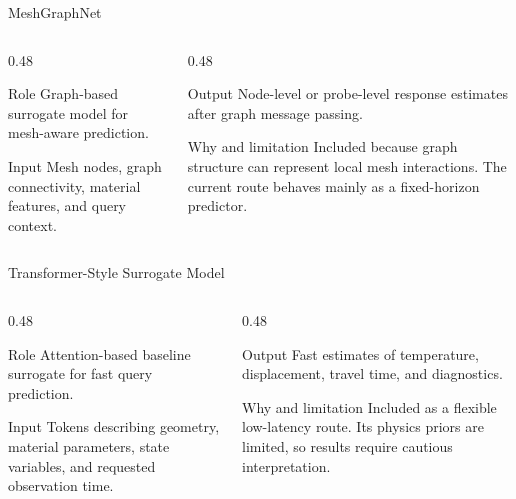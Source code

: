 \documentclass[aspectratio=169,10pt]{beamer}
\begin{document}
\begin{frame}{MeshGraphNet}
  \begin{columns}[T]
    \begin{column}{0.48\textwidth}
      \begin{block}{Role}
        Graph-based surrogate model for mesh-aware prediction.
      \end{block}
      \begin{block}{Input}
        \footnotesize
        Mesh nodes, graph connectivity, material features, and query context.
      \end{block}
    \end{column}
    \begin{column}{0.48\textwidth}
      \begin{block}{Output}
        \footnotesize
        Node-level or probe-level response estimates after graph message passing.
      \end{block}
      \begin{block}{Why and limitation}
        \footnotesize
        Included because graph structure can represent local mesh interactions.
        The current route behaves mainly as a fixed-horizon predictor.
      \end{block}
    \end{column}
  \end{columns}
\end{frame}

\begin{frame}{Transformer-Style Surrogate Model}
  \begin{columns}[T]
    \begin{column}{0.48\textwidth}
      \begin{block}{Role}
        Attention-based baseline surrogate for fast query prediction.
      \end{block}
      \begin{block}{Input}
        \footnotesize
        Tokens describing geometry, material parameters, state variables,
        and requested observation time.
      \end{block}
    \end{column}
    \begin{column}{0.48\textwidth}
      \begin{block}{Output}
        \footnotesize
        Fast estimates of temperature, displacement, travel time, and diagnostics.
      \end{block}
      \begin{block}{Why and limitation}
        \footnotesize
        Included as a flexible low-latency route. Its physics priors are limited,
        so results require cautious interpretation.
      \end{block}
    \end{column}
  \end{columns}
\end{frame}
\end{document}
